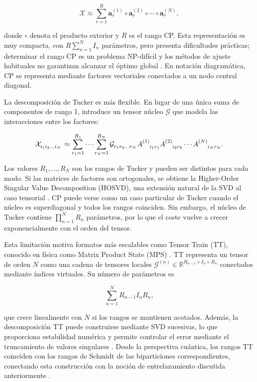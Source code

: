 \begin{equation} \label{eq: CP}
    \boldsymbol{\mathcal{X}} \approx \sum_{r=1}^{R} 
    \mathbf{a}_r^{(1)} \circ \mathbf{a}_r^{(2)} \circ \cdots \circ \mathbf{a}_r^{(N)} ,
\end{equation}

donde $\circ$ denota el producto exterior y $R$ es el rango CP. Esta representación es muy compacta, con $R \sum_{n=1}^{N} I_n$ parámetros, pero presenta dificultades prácticas; determinar el rango CP es un problema NP-difícil y los métodos de ajuste habituales no garantizan alcanzar el óptimo global . En notación diagramática, CP se representa mediante factores vectoriales conectados a un nodo central diagonal.

La descomposición de Tucker es más flexible. En lugar de una única suma de componentes de rango 1, introduce un tensor núcleo $\boldsymbol{\mathcal{G}}$ que modela las interacciones entre los factores:

\begin{equation} \label{eq: Tucker}
    \tensor{\mathcal{X}}{_{i_1}_{i_2}_{...}_{i_N}} \approx 
    \sum_{r_1=1}^{R_1} \cdots \sum_{r_N=1}^{R_N}
    \tensor{\mathcal{G}}{_{r_1}_{r_2}_{...}_{r_N}}
    \tensor{A}{^{(1)}_{i_1 r_1}}
    \tensor{A}{^{(2)}_{i_2 r_2}}
    \cdots
    \tensor{A}{^{(N)}_{i_N r_N}} .
\end{equation}

Los valores $R_1,\ldots,R_N$ son los rangos de Tucker y pueden ser distintos para cada modo. Si las matrices de factores son ortogonales, se obtiene la Higher-Order Singular Value Decomposition (HOSVD), una extensión natural de la SVD al caso tensorial . CP puede verse como un caso particular de Tucker cuando el núcleo es superdiagonal y todos los rangos coinciden. Sin embargo, el núcleo de Tucker contiene $\prod_{n=1}^{N} R_n$ parámetros, por lo que el coste vuelve a crecer exponencialmente con el orden del tensor.

Esta limitación motiva formatos más escalables como Tensor Train (TT), conocido en física como Matrix Product State (MPS) . TT representa un tensor de orden $N$ como una cadena de tensores locales $\boldsymbol{\mathcal{G}}^{(n)} \in \mathbb{R}^{R_{n-1} \times I_n \times R_n}$ conectados mediante índices virtuales. Su número de parámetros es

\[
    \sum_{n=1}^{N} R_{n-1} I_n R_n ,
\]

que crece linealmente con $N$ si los rangos se mantienen acotados. Además, la descomposición TT puede construirse mediante SVD sucesivas, lo que proporciona estabilidad numérica y permite controlar el error mediante el truncamiento de valores singulares . Desde la perspectiva cuántica, los rangos TT coinciden con los rangos de Schmidt de las biparticiones correspondientes, conectando esta construcción con la noción de entrelazamiento discutida anteriormente .

